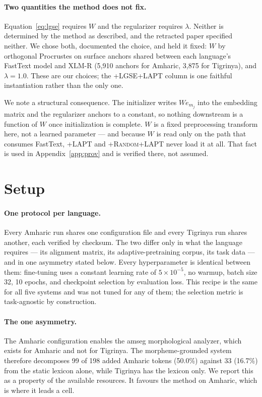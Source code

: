 \documentclass[11pt]{article}
\begin{document}
\paragraph{Two quantities the method does not fix.}
Equation~\ref{eq:lgse} requires $W$ and the regularizer requires $\lambda$.
Neither is determined by the method as described, and the retracted paper
specified neither. We chose both, documented the choice, and held it fixed:
$W$ by orthogonal Procrustes on surface anchors shared between each
language's FastText model and XLM-R (5{,}910 anchors for Amharic, 3{,}875 for
Tigrinya), and $\lambda = 1.0$. These are our choices; the
\textsc{+LGSE+LAPT} column is one faithful instantiation rather than the only
one.

We note a structural consequence. The initializer writes $We_{m_j}$ into the
embedding matrix and the regularizer anchors to a constant, so nothing
downstream is a function of $W$ once initialization is complete. $W$ is a
fixed preprocessing transform here, not a learned parameter --- and because
$W$ is read only on the path that consumes FastText, \textsc{+LAPT} and
\textsc{+Random+LAPT} never load it at all. That fact is used in
Appendix~\ref{app:prov} and is verified there, not assumed.

\section{Setup}
\label{sec:setup}

\paragraph{One protocol per language.} Every Amharic run shares one
configuration file and every Tigrinya run shares another, each verified by
checksum. The two differ only in what the language requires --- its
alignment matrix, its adaptive-pretraining corpus, its task data --- and in
one asymmetry stated below. Every hyperparameter is identical between them:
fine-tuning uses a constant learning rate of $5\times10^{-5}$, no warmup,
batch size 32, 10 epochs, and checkpoint selection by evaluation loss. This
recipe is the same for all five systems and was not tuned for any of them;
the selection metric is task-agnostic by construction.

\paragraph{The one asymmetry.} The Amharic configuration enables the amseg
morphological analyzer, which exists for Amharic and not for Tigrinya. The
morpheme-grounded system therefore decomposes 99 of 198 added Amharic tokens
(50.0\%) against 33 (16.7\%) from the static lexicon alone, while Tigrinya
has the lexicon only. We report this as a property of the available
resources. It favours the method on Amharic, which is where it leads a cell.
\end{document}
